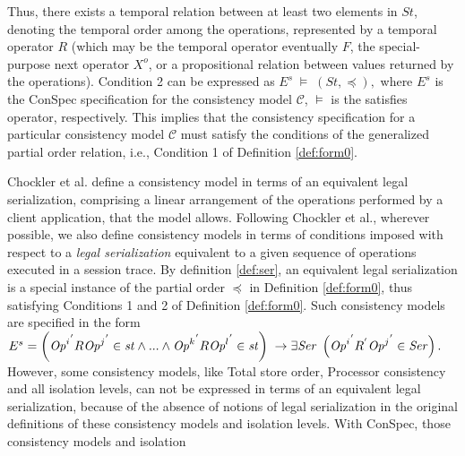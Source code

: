 \documentclass{sig-alternate-05-2015}
\begin{document}
  Thus, there exists a temporal relation between at least two elements in $\mathit{St}$, denoting the temporal order among
   the operations, represented by a temporal operator $R$ (which may be the temporal operator eventually $F$, the
   special-purpose next operator $X^o$, or a propositional relation between values returned by the operations). %
  Condition 2 can be expressed as $ E^s\; \vDash \; \left( \mathit{St}, \preccurlyeq \right),$ where %
  $E^s$ is the ConSpec specification for the
 consistency model $\mathcal{C}$,
   $\vDash$ is the satisfies operator, respectively.
  This implies that the consistency specification for a particular
  consistency model  $\mathcal{C}$ must satisfy the conditions of the generalized partial order relation, i.e., Condition 1 of Definition \ref{def:form0}.
    \par Chockler et al. \cite{Chockler2000} define a consistency model in terms of an equivalent legal serialization,
 comprising a linear arrangement of the operations performed by a client application, that the model allows.
   Following Chockler et al., wherever possible, we also define consistency models in terms of conditions imposed with
   respect to a \emph{legal serialization} equivalent to a given sequence of operations executed in a session trace.  By definition \ref{def:ser}, an equivalent legal serialization is a special instance of the partial order $\preccurlyeq$ in Definition \ref{def:form0}, thus satisfying Conditions 1 and 2 of Definition \ref{def:form0}.  Such consistency models are specified in the form $E^s = \left( {\mathit{Op}^i}^{'} R {\mathit{Op}^j}^{'} \in \mathit{st} \wedge ... \wedge {\mathit{Op}^k}^{'} R {\mathit{Op}^l}^{'} \in \mathit{st}
     \right)\; \rightarrow \\
      \exists \mathit{Ser} \; \left( {\mathit{Op}^i}^{'} R^{'} {\mathit{Op}^j}^{'} \in  \mathit{Ser} \right).$
   However, some consistency models, like Total store order, Processor consistency and all isolation levels, can not be
   expressed in terms of an equivalent legal serialization, because of the absence of notions of legal serialization in
   the original  definitions of these consistency models and isolation levels. With ConSpec, those consistency models and isolation
\end{document}
